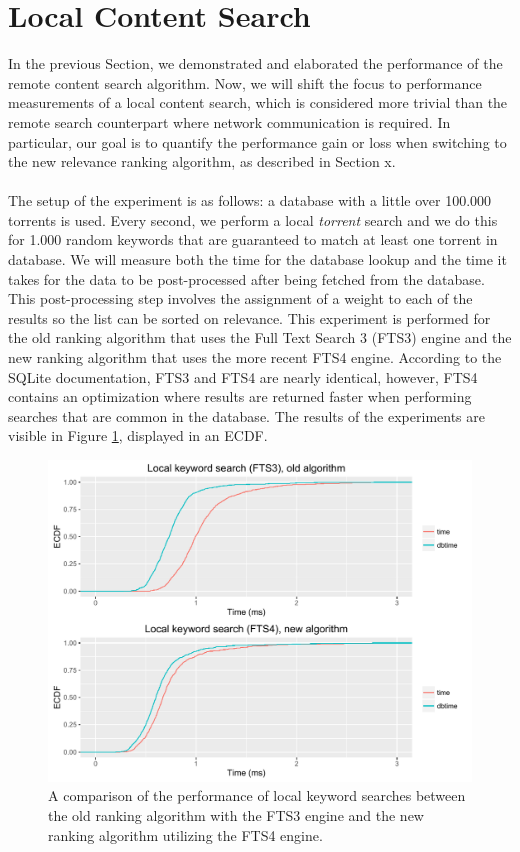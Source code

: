 \section{Local Content Search}
In the previous Section, we demonstrated and elaborated the performance of the remote content search algorithm. Now, we will shift the focus to performance measurements of a local content search, which is considered more trivial than the remote search counterpart where network communication is required. In particular, our goal is to quantify the performance gain or loss when switching to the new relevance ranking algorithm, as described in Section x.\\\\
The setup of the experiment is as follows: a database with a little over 100.000 torrents is used. Every second, we perform a local \emph{torrent} search and we do this for 1.000 random keywords that are guaranteed to match at least one torrent in database. We will measure both the time for the database lookup and the time it takes for the data to be post-processed after being fetched from the database. This post-processing step involves the assignment of a weight to each of the results so the list can be sorted on relevance. This experiment is performed for the old ranking algorithm that uses the Full Text Search 3 (FTS3) engine and the new ranking algorithm that uses the more recent FTS4 engine. According to the SQLite documentation, FTS3 and FTS4 are nearly identical, however, FTS4 contains an optimization where results are returned faster when performing searches that are common in the database. The results of the experiments are visible in Figure \ref{fig:local-search-fts3-fts4}, displayed in an ECDF.\\

\begin{figure}[h!]
	\centering
	\includegraphics[width=1.0\columnwidth]{images/experiments/local_search_fts3_fts4}
	\caption{A comparison of the performance of local keyword searches between the old ranking algorithm with the FTS3 engine and the new ranking algorithm utilizing the FTS4 engine.}
	\label{fig:local-search-fts3-fts4}
\end{figure}

